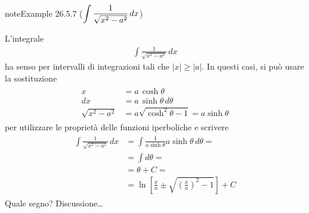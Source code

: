 \documentclass[letterpaper,10pt,italian]{jupyterBook}
\begin{document}
\begin{sphinxadmonition}{note}{Example 26.5.7 (\protect\(\displaystyle \int \frac{1}{\sqrt{x^2 - a^2}} \,  dx\protect\))}



\sphinxAtStartPar
L’integrale
\begin{equation*}
\begin{split}\int \frac{1}{\sqrt{x^2 - a^2}} \,  dx\end{split}
\end{equation*}
\sphinxAtStartPar
ha senso per intervalli di integrazioni tali che \(|x| \ge |a|\). In questi casi, si può usare la sostituzione
\begin{equation*}
\begin{split}\begin{aligned}
   x & = a \, \cosh \theta \\
  dx & = a \, \sinh \theta \, d \theta \\
  \sqrt{x^2 - a^2} & = a \sqrt{\cosh^2 \theta - 1} = a \sinh \theta
\end{aligned}\end{split}
\end{equation*}
\sphinxAtStartPar
per utilizzare le proprietà delle funzioni iperboliche e scrivere
\begin{equation*}
\begin{split}\begin{aligned}
  \int \frac{1}{\sqrt{x^2 - a^2}} \, dx
   & = \int \frac{1}{a \sinh \theta} a \sinh \theta \, d \theta = \\
   & = \int  d \theta = \\
   & = \theta + C = \\
   & = \ln \left[ \frac{x}{a} \pm \sqrt{\left( \frac{x}{a} \right)^2 - 1} \right] + C
\end{aligned}\end{split}
\end{equation*}
\sphinxAtStartPar
{} Quale segno? Discussione… 
\end{sphinxadmonition}
\end{document}
